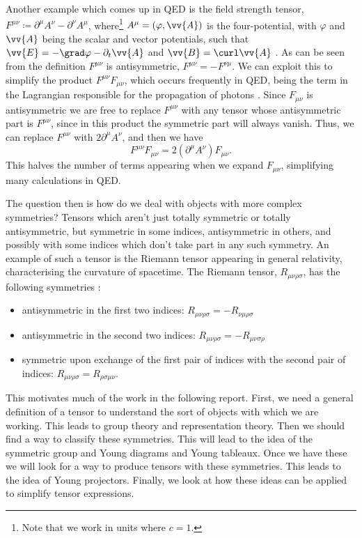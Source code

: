 \documentclass[fleqn]{NotesClass}
\begin{document}
    Another example which comes up in QED is the field strength tensor, \(F^{\mu\nu} \coloneqq \partial^\mu A^\nu - \partial^\nu A^\mu\), where\footnote{Note that we work in units where \(c = 1\).} \(A^\mu = (\varphi, \vv{A})\) is the four-potential, with \(\varphi\) and \(\vv{A}\) being the scalar and vector potentials, such that \(\vv{E} = -\grad\varphi - \partial_t\vv{A}\) and \(\vv{B} = \curl\vv{A}\) \cite[569]{griffiths}.
    As can be seen from the definition \(F^{\mu\nu}\) is antisymmetric, \(F^{\mu\nu} = -F^{\nu\mu}\).
    We can exploit this to simplify the product \(F^{\mu\nu}F_{\mu\nu}\), which occurs frequently in QED, being the term in the Lagrangian responsible for the propagation of photons \cite[294]{peskin}.
    Since \(F_{\mu\nu}\) is antisymmetric we are free to replace \(F^{\mu\nu}\) with any tensor whose antisymmetric part is \(F^{\mu\nu}\), since in this product the symmetric part will always vanish.
    Thus, we can replace \(F^{\mu\nu}\) with \(2\partial^\mu A^\nu\), and then we have
    \begin{equation}
        F^{\mu\nu}F_{\mu\nu} = 2(\partial^\mu A^\nu)F_{\mu\nu}.
    \end{equation}
    This halves the number of terms appearing when we expand \(F_{\mu\nu}\), simplifying many calculations in QED.
    
    The question then is how do we deal with objects with more complex symmetries?
    Tensors which aren't just totally symmetric or totally antisymmetric, but symmetric in some indices, antisymmetric in others, and possibly with some indices which don't take part in any such symmetry.
    An example of such a tensor is the Riemann tensor appearing in general relativity, characterising the curvature of spacetime.
    The Riemann tensor, \(R_{\mu\nu\rho\sigma}\), has the following symmetries \cite[141]{weinberg}:
    \begin{itemize}
        \item antisymmetric in the first two indices: \(R_{\mu\nu\rho\sigma} = -R_{\nu\mu\rho\sigma}\)
        \item antisymmetric in the second two indices: \(R_{\mu\nu\rho\sigma} = -R_{\mu\nu\sigma\rho}\)
        \item symmetric upon exchange of the first pair of indices with the second pair of indices: \(R_{\mu\nu\rho\sigma} = R_{\rho\sigma\mu\nu}\).
    \end{itemize}
    
    This motivates much of the work in the following report.
    First, we need a general definition of a tensor to understand the sort of objects with which we are working.
    This leads to group theory and representation theory.
    Then we should find a way to classify these symmetries.
    This will lead to the idea of the symmetric group and Young diagrams and Young tableaux.
    Once we have these we will look for a way to produce tensors with these symmetries.
    This leads to the idea of Young projectors.
    Finally, we look at how these ideas can be applied to simplify tensor expressions.
    
\end{document}

